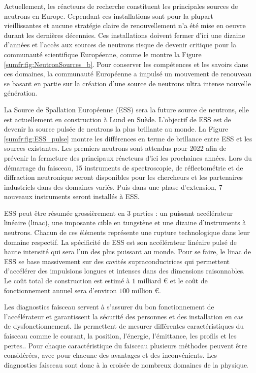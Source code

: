 Actuellement, les réacteurs de recherche constituent les principales sources de neutrons en Europe. Cependant ces installations sont pour la plupart vieillissantes et aucune stratégie claire de renouvellement n'a été mise en oeuvre durant les dernières décennies. Ces installations doivent fermer d'ici une dizaine d'années et l'accès aux sources de neutrons risque de devenir critique pour la  communauté scientifique Européenne, comme le montre la Figure \ref{sumfr:fig:NeutronSources_b}. Pour conserver les compétences et les savoirs dans ces domaines, la communauté Européenne a impulsé un mouvement de renouveau se basant en partie sur la création d'une source de neutrons ultra intense nouvelle génération.

La Source de Spallation Européenne (ESS) sera la future source de neutrons, elle est actuellement en construction à Lund en Suède. L’objectif de ESS est de devenir la source pulsée de neutrons la plus brillante au monde. La Figure \ref{sumfr:fig:ESS_pulse} montre les différences en terme de brillance entre ESS et les sources existantes. Les premiers neutrons sont attendus pour 2022 afin de prévenir la fermeture des principaux réacteurs  d’ici les prochaines années. Lors du démarrage du faisceau, 15 instruments de spectroscopie, de réflectométrie et de diffraction neutronique seront disponibles pour les chercheurs et les partenaires industriels dans des domaines variés. Puis dans une phase d’extension, 7 nouveaux instruments seront installés à ESS.


ESS peut être résumée grossièrement en 3 parties : un puissant accélérateur linéaire (linac), une imposante cible en tungstène et une dizaine d’instruments à neutrons. Chacun de ces éléments représente une rupture technologique dans leur domaine respectif. La spécificité de ESS est son accélérateur linéaire pulsé de haute intensité qui sera l’un des plus puissant au monde. Pour se faire, le linac de ESS se base massivement sur des cavités supraconductrices qui permettent d'accélérer des impulsions longues et intenses dans des dimensions raisonnables. Le coût total de construction est estimé à $1$ milliard € et le coût de fonctionnement annuel sera d'environ $100$ million €.


Les diagnostics faisceau servent à s’assurer du bon fonctionnement de l'accélérateur et garantissent la sécurité des personnes et des installation en cas de dysfonctionnement. Ils permettent de mesurer différentes caractéristiques du faisceau comme le courant, la position, l’énergie, l'émittance, les profils et les pertes.. Pour chaque caractéristique du faisceau plusieurs méthodes peuvent être considérées, avec pour chacune des avantages et des inconvénients. Les diagnostics faisceau sont donc à la croisée de nombreux domaines de la physique.

